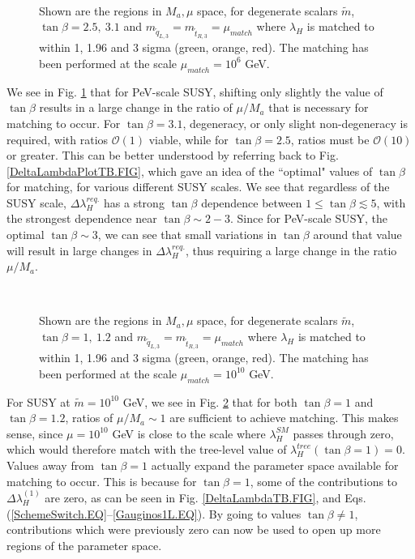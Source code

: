 \documentclass[12pt]{article}
\newcommand{\Order}{\mathcal{O}}
\newcommand{\sq}{\tilde{q}}
\newcommand{\mStL}{m_{\sq_{L,3}}}
\newcommand{\mStR}{m_{\tilde{t}_{R,3}}}
\newcommand{\mS}{\tilde{m}}
\begin{document}
\begin{figure}[t]
\centering
{} ~~  
\caption{Shown are the regions in $M_a, \mu$ space, for degenerate scalars $\mS$, $\tan\beta=2.5,~3.1$ and $\mStL=\mStR=\mu_{match}$ where $\lambda_H$ is matched to within 1, 1.96 and 3 sigma (green, orange, red). The matching has been performed at the scale $\mu_{match}=10^{6}$ GeV.
}
\label{PeV_contours.FIG}
\end{figure}

We see in Fig. \ref{PeV_contours.FIG} that for PeV-scale SUSY, shifting only slightly the value of $\tan\beta$ results in a large change in the ratio of $\mu/M_a$ that is necessary for matching to occur. For $\tan\beta=3.1$, degeneracy, or only slight non-degeneracy is required, with ratios $\Order(1)$ viable, while for $\tan\beta=2.5$, ratios must be $\Order(10)$ or greater. This can be better understood by referring back to Fig. \ref{DeltaLambdaPlotTB.FIG}, which gave an idea of the ``optimal" values of $\tan\beta$ for matching, for various different SUSY scales. We see that regardless of the SUSY scale, $\Delta\lambda_H^{req.}$ has a strong $\tan\beta$ dependence between $1 \leq \tan\beta \lesssim 5$, with the strongest dependence near $\tan\beta\sim2-3$. Since for PeV-scale SUSY, the optimal $\tan\beta \sim 3$, we can see that small variations in $\tan\beta$ around that value will result in large changes in $\Delta\lambda_H^{req.}$, thus requiring a large change in the ratio $\mu/M_a$.

\begin{figure}[t]
\centering
{} ~~  
\caption{Shown are the regions in $M_a, \mu$ space, for degenerate scalars $\mS$, $\tan\beta=1,~1.2$ and $\mStL=\mStR=\mu_{match}$ where $\lambda_H$ is matched to within 1, 1.96 and 3 sigma (green, orange, red). The matching has been performed at the scale $\mu_{match}=10^{10}$ GeV.
}
\label{10_contours.FIG}
\end{figure}

For SUSY at $\mS=10^{10}$ GeV, we see in Fig. \ref{10_contours.FIG} that for both $\tan\beta=1$ and $\tan\beta=1.2$, ratios of $\mu/M_a \sim 1$ are sufficient to achieve matching. This makes sense, since $\mu = 10^{10}$ GeV is close to the scale where $\lambda_H^{SM}$ passes through zero, which would therefore match with the tree-level value of $\lambda_H^{tree}(\tan\beta=1) = 0$. Values away from $\tan\beta=1$ actually expand the parameter space available for matching to occur. This is because for $\tan\beta=1$, some of the contributions to $\Delta\lambda^{(1)}_H$ are zero, as can be seen in Fig. \ref{DeltaLambdaTB.FIG}, and Eqs. (\ref{SchemeSwitch.EQ}--\ref{Gauginos1L.EQ}). By going to values $\tan\beta \neq 1$, contributions which were previously zero can now be used to open up more regions of the parameter space.
\end{document}
